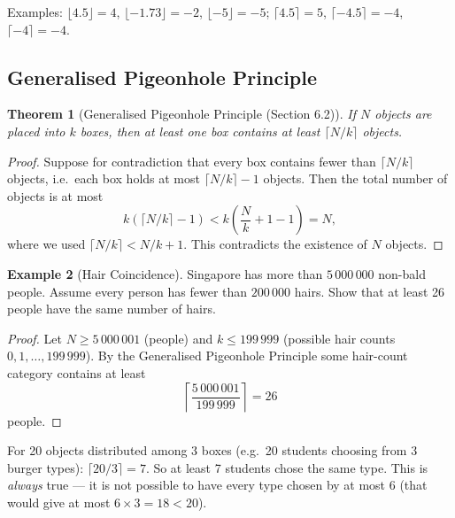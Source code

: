 \documentclass[11pt, a4paper, notitlepage]{report}
\newtheorem{theorem}{Theorem}[section]
\theoremstyle{definition}
\newtheorem{example}[theorem]{Example}
\theoremstyle{remark}
\begin{document}
Examples: $\lfloor 4.5 \rfloor = 4$, $\lfloor -1.73 \rfloor = -2$, $\lfloor -5 \rfloor = -5$;
$\lceil 4.5 \rceil = 5$, $\lceil -4.5 \rceil = -4$, $\lceil -4 \rceil = -4$.

\subsection{Generalised Pigeonhole Principle}

\begin{theorem}[Generalised Pigeonhole Principle (Section 6.2)]
\label{thm:gen-pigeonhole}
If $N$ objects are placed into $k$ boxes, then at least one box contains at least
$\lceil N/k \rceil$ objects.
\end{theorem}

\begin{proof}
Suppose for contradiction that every box contains fewer than $\lceil N/k \rceil$ objects, i.e.\
each box holds at most $\lceil N/k \rceil - 1$ objects. Then the total number of objects is at most
\[
  k\!\left(\lceil N/k \rceil - 1\right)
  < k\!\left(\frac{N}{k} + 1 - 1\right)
  = N,
\]
where we used $\lceil N/k \rceil < N/k + 1$. This contradicts the existence of $N$ objects.
\end{proof}

\begin{example}[Hair Coincidence]
Singapore has more than $5\,000\,000$ non-bald people. Assume every person has fewer than
$200\,000$ hairs. Show that at least 26 people have the same number of hairs.
\end{example}

\begin{proof}
Let $N \geq 5\,000\,001$ (people) and $k \leq 199\,999$ (possible hair counts $0,1,\ldots,199\,999$).
By the Generalised Pigeonhole Principle some hair-count category contains at least
\[
  \left\lceil \frac{5\,000\,001}{199\,999} \right\rceil = 26
\]
people.
\end{proof}

\begin{examtip}[title={Exam Tip: Generalised Pigeonhole Ceiling Computation}]
For 20 objects distributed among 3 boxes (e.g.\ 20 students choosing from 3 burger types):
$\lceil 20/3 \rceil = 7$. So at least 7 students chose the same type. This is \emph{always}
true — it is not possible to have every type chosen by at most 6 (that would give at most
$6 \times 3 = 18 < 20$).
\end{examtip}

\end{document}
